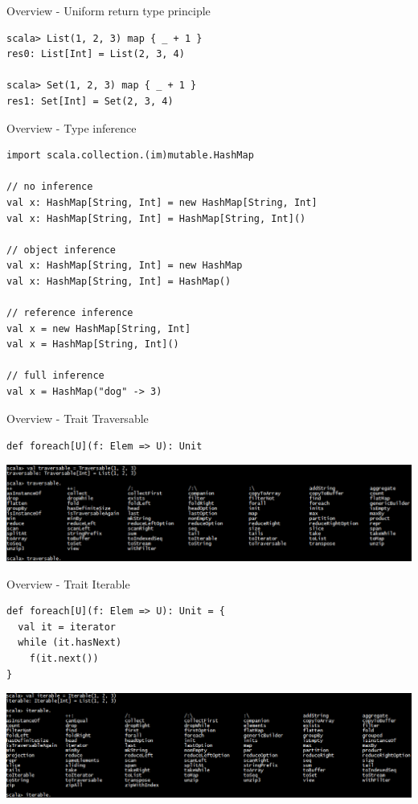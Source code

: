 \begin{frame}[fragile]{Overview - Uniform return type principle}
\begin{lstlisting}
scala> List(1, 2, 3) map { _ + 1 }
res0: List[Int] = List(2, 3, 4)

scala> Set(1, 2, 3) map { _ + 1 }
res1: Set[Int] = Set(2, 3, 4) 
\end{lstlisting}
\end{frame}

\begin{frame}[fragile]{Overview - Type inference}
\begin{lstlisting}
import scala.collection.(im)mutable.HashMap

// no inference
val x: HashMap[String, Int] = new HashMap[String, Int]
val x: HashMap[String, Int] = HashMap[String, Int]()

// object inference
val x: HashMap[String, Int] = new HashMap
val x: HashMap[String, Int] = HashMap()

// reference inference
val x = new HashMap[String, Int]
val x = HashMap[String, Int]()

// full inference
val x = HashMap("dog" -> 3)
\end{lstlisting}
\end{frame}

\begin{frame}[fragile]{Overview - Trait Traversable}
\begin{center}
\lstinline!def foreach[U](f: Elem => U): Unit!
\end{center}
\begin{center}
\includegraphics[width = \textwidth]{resources/Traversable.png}
\end{center}
\end{frame}

\begin{frame}[fragile]{Overview - Trait Iterable}
\begin{center}
\begin{lstlisting}
def foreach[U](f: Elem => U): Unit = {
  val it = iterator
  while (it.hasNext)
    f(it.next())
} 
\end{lstlisting}
\end{center}
\begin{center}
\includegraphics[width = \textwidth]{resources/Iterable.png}
\end{center}
\end{frame}

